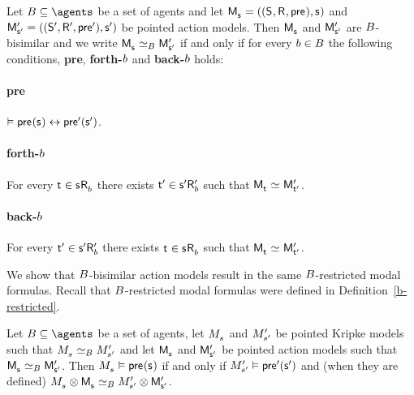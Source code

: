 \begin{definition}
Let $\agentsB \subseteq \agents$ be a set of agents and let $\aPModelAndTuple{\aStateS}$ and $\aPModelAndTupleP{\aStateSP}$ be pointed action models.
Then $\aPModel{\aStateS}$ and ${\mathsf{M}^{\prime}_{{\mathsf{{s}}^{\prime}}}}$ are $B$-bisimilar and we write $\aPModel{\aStateS} \bisimilar[\agentsB] \aPModelP{\aStateSP}$ if and only if for every $b \in B$ the following conditions, {\bf pre}, {\bf forth-$b$} and {\bf back-$b$} holds:

\paragraph{pre}
$\entails \aPrecondition(\aStateS) \iff \aPreconditionP(\aStateSP)$.

\paragraph{forth-$b$}
For every $\aStateT \in \aSuccessorsB{\aStateS}$ there exists ${\mathsf{{t}}^{\prime}} \in {{\mathsf{{s}}^{\prime}}} {\mathsf{R}^{\prime}_{b}}$ such that $\aPModel{\aStateT} \bisimilar \aPModelP{\aStateTP}$.

\paragraph{back-$b$}
For every ${\mathsf{{t}}^{\prime}} \in {{\mathsf{{s}}^{\prime}}} {\mathsf{R}^{\prime}_{b}}$ there exists $\aStateT \in \aSuccessorsB{\aStateS}$ such that $\aPModel{\aStateT} \bisimilar \aPModelP{\aStateTP}$.
\end{definition}

We show that $B$-bisimilar action models result in the same $B$-restricted modal formulas.
Recall that $B$-restricted modal formulas were defined in Definition~\ref{b-restricted}.

\begin{lemma}\label{action-b-bisimulation-results}
Let $\agentsB \subseteq \agents$ be a set of agents, let $\kPModel{\kStateS}$ and ${M^{\prime}_{{s}^{\prime}}}$ be pointed Kripke models such that $\kPModel{\kStateS} \bisimilar[\agentsB] \kPModelP{\kStateSP}$ and let $\aPModel{\aStateS}$ and ${\mathsf{M}^{\prime}_{{\mathsf{{s}}^{\prime}}}}$ be pointed action models such that $\aPModel{\aStateS} \bisimilar[\agentsB] \aPModelP{\aStateSP}$.
Then $\kPModel{\kStateS} \entails \aPrecondition(\aStateS)$ if and only if ${M^{\prime}_{{s}^{\prime}}} \vDash {\mathsf{pre}^{\prime}}({\mathsf{{s}}^{\prime}})$ and (when they are defined) $\kPModel{\kStateS} \exec \aPModel{\aStateS} \bisimilar[\agentsB] \kPModelP{\kStateSP} \exec \aPModelP{\aStateSP}$.
\end{lemma}

